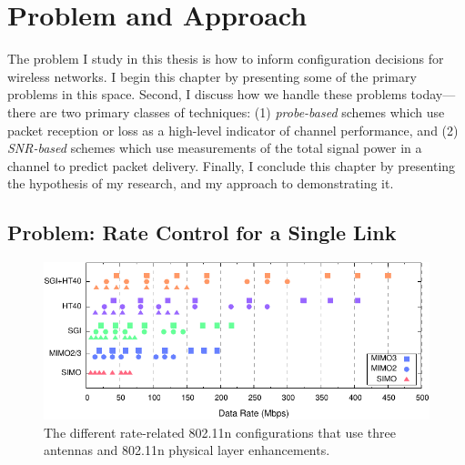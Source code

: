 \ifx\mainfile\undefined

\setcounter{chapter}{2} %
\fi

\cleardoublepage
\chapter{Problem and Approach}
\label{chap:problem}
\label{chap:approach}

The problem I study in this thesis is how to inform configuration decisions for wireless networks. I begin this chapter by presenting some of the primary problems in this space. Second, I discuss how we handle these problems today---there are two primary classes of techniques: (1) \emph{probe-based} schemes which use packet reception or loss as a high-level indicator of channel performance, and (2) \emph{SNR-based} schemes which use measurements of the total signal power in a channel to predict packet delivery. Finally, I conclude this chapter by presenting the hypothesis of my research, and my approach to demonstrating it.


%
\section{Problem: Rate Control for a Single Link}
\begin{figure}[t]
	\centering
	\includegraphics[width=\textwidth]{figures/rate_configs.pdf}
	\caption{\label{fig:rate_configs}The different rate-related 802.11n configurations that use three antennas and 802.11n physical layer enhancements.}
\end{figure}

